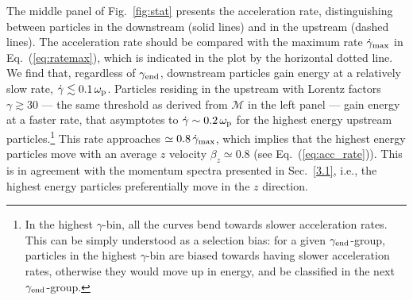 \documentclass[twocolumn,twocolappendix]{aastex63}
\newcommand{\eq}[1]{Eq.~(\ref{eq:#1})}
\newcommand{\ls}{\textcolor{teal}}
\newcommand{\hz}{\textcolor{orange}}
\newcommand{\omp}{\omega_{\rm p}}
\begin{document}

The middle panel of Fig.~\ref{fig:stat} presents the acceleration rate, distinguishing between particles in the downstream (solid lines) and in the upstream (dashed lines). The acceleration rate should be compared with the maximum rate $\dot{\gamma}_{\rm max}$ in \eq{ratemax}, which is indicated in the plot by the horizontal dotted line. We find that, regardless of $\gamma_{\rm end}$, downstream particles gain energy at a relatively slow rate, $\dot{\gamma}\lesssim 0.1\,\omp$. Particles residing in the upstream with Lorentz factors $\gamma\gtrsim 30$ --- the same threshold as derived from $\mathcal{M}$ in the left panel ---
gain energy at a faster rate, that asymptotes to  $\dot{\gamma}\sim 0.2\,\omp$ for the highest energy upstream particles.\footnote{In the highest $\gamma$-bin, all the curves bend towards slower acceleration rates. This can be simply understood as a selection bias: for a given $\gamma_{\rm end}$-group, particles in the highest $\gamma$-bin are biased towards having slower acceleration rates, otherwise they would move up in energy, and be classified in the next $\gamma_{\rm end}$-group.} This rate approaches $\simeq 0.8\,\dot{\gamma}_{\rm max}$, which implies that the highest energy particles move with an average $z$ velocity $\beta_z\simeq 0.8$ (see \eq{acc_rate}). This is in agreement with the momentum spectra presented in Sec.~\ref{3.1}, i.e., the highest energy particles preferentially move in the $z$ direction.
\end{document}
